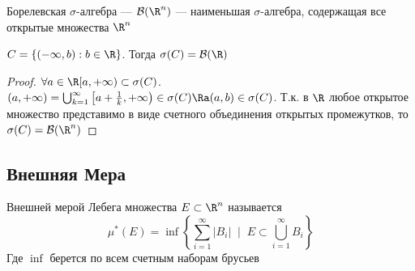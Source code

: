 \begin{definition}
    Борелевская \(\sigma\)-алгебра --- \(\mathcal{B}(\R^n)\) --- наименьшая \(\sigma\)-алгебра, содержащая все открытые множества \(\R^n\)
\end{definition}

\begin{lemma}
    \(C = \{(-\infty, b): b \in \R\}\). Тогда \(\sigma(C) = \mathcal{B}(\R)\)
\end{lemma}
\begin{proof}
    \(\forall a \in \R [a, +\infty) \subset \sigma(C)\). \((a, +\infty) = \bigcup_{k = 1}^\infty \left[a + \frac{1}{k}, +\infty\right) \in \sigma(C) \Ra (a, b) \in \sigma(C)\). Т.к. в \(\R\) любое открытое множество представимо в виде счетного объединения открытых промежутков, то \(\sigma(C) = \mathcal{B}(\R^n)\)
\end{proof}

\subsection{Внешняя Мера}
\begin{definition}
    Внешней мерой Лебега множества \(E \subset \R^n\) называется 
    \[\mu^*(E) = \inf \left\{\sum_{i = 1}^\infty |B_i|\;\;|\;\;E \subset \bigcup_{i = 1}^\infty B_i\right\}\]
    Где \(\inf\) берется по всем счетным наборам брусьев
\end{definition}

